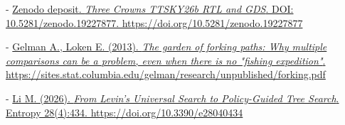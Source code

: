 - \href{https://doi.org/10.5281/zenodo.19227877}{Zenodo deposit. \textit{Three Crowns TTSKY26b RTL and GDS}. DOI: 10.5281/zenodo.19227877. https://doi.org/10.5281/zenodo.19227877}

- \href{https://sites.stat.columbia.edu/gelman/research/unpublished/forking.pdf}{Gelman A., Loken E. (2013). \textit{The garden of forking paths: Why multiple comparisons can be a problem, even when there is no "fishing expedition"}. https://sites.stat.columbia.edu/gelman/research/unpublished/forking.pdf}

- \href{https://doi.org/10.3390/e28040434}{Li M. (2026). \textit{From Levin's Universal Search to Policy-Guided Tree Search}. Entropy 28(4):434. https://doi.org/10.3390/e28040434}
